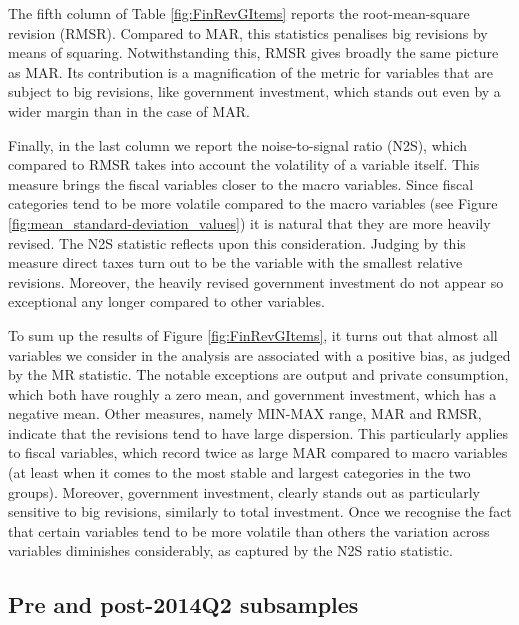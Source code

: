 The fifth column of Table \ref{fig:FinRevGItems} reports the
root-mean-square revision (RMSR). Compared to MAR, this statistics penalises
big revisions by means of squaring. Notwithstanding this, RMSR
gives broadly the same picture as MAR. Its contribution is a magnification
of the metric for variables that are subject to big revisions, like
government investment, which stands out even by a wider margin than in the case of MAR.

Finally, in the last column we report the noise-to-signal ratio (N2S), which compared to RMSR takes into account the volatility of
a variable itself. This measure brings the fiscal variables closer to the macro variables.
Since fiscal categories tend to be more volatile compared to the macro variables (see Figure \ref{fig:mean_standard-deviation_values}) it is natural that they are more heavily revised. The N2S statistic reflects upon  this consideration. Judging by this measure direct taxes turn out to be the variable with the smallest relative revisions. Moreover, the heavily revised government investment 
do not appear so exceptional any longer compared to other variables.

To sum up the results of Figure \ref{fig:FinRevGItems}, it turns out
that almost all variables we consider in the analysis are associated
with a positive bias, as judged by the MR statistic. The notable exceptions
are output and private consumption, which both have roughly a zero mean, and government investment, which has a negative mean. Other measures, namely MIN-MAX range, MAR and RMSR, indicate that the
revisions tend to have large dispersion. This particularly applies to fiscal variables, which record twice as large MAR compared to macro variables (at least when it comes to the most stable and largest categories in the two groups). Moreover, government
investment, clearly stands out as particularly sensitive to big revisions, 
similarly to total investment. Once we recognise the fact 
that certain variables tend to be more volatile than others the variation across variables diminishes considerably, as captured by the N2S ratio statistic.

\subsection{Pre and post-2014Q2 subsamples}

